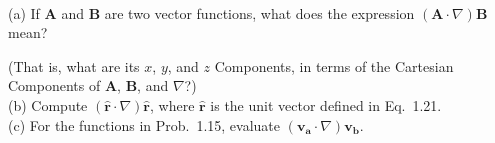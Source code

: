             \begin{prob}[1.22]~\\
                (a) If \textbf{A} and \textbf{B} are two vector functions, what does the expression $ (\mathbf{A}\cdot\nabla)\mathbf{B}$ mean?

                (That is, what are its $x$, $y$, and $z$ Components, in terms of the Cartesian Components of \textbf{A}, \textbf{B}, and $\nabla$?) \\

                \noindent (b) Compute $(\mathbf{\hat{r}} \cdot\nabla)\mathbf{\hat{r}}$, where $\mathbf{\hat{r}}$ is the unit vector defined in Eq.~1.21. \\

                \noindent (c) For the functions in Prob.~1.15, evaluate $(\mathbf{v_a}\cdot\nabla)\mathbf{v_b}$.

            \end{prob}

